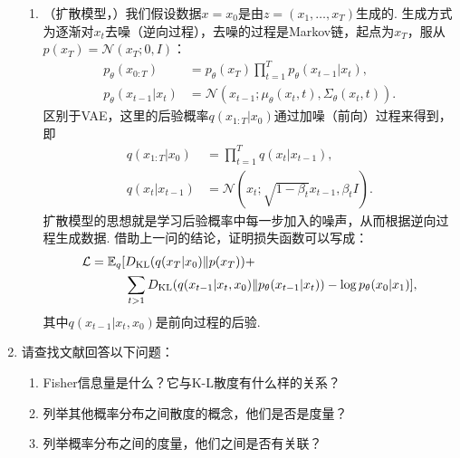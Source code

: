 \begin{enumerate}[wide, labelindent=0pt]
\begin{enumerate}
        \item （扩散模型，\cite{hoDenoisingDiffusionProbabilistic2020}）我们假设数据$x=x_{0}$是由$z=(x_{1},\dots,x_{T})$生成的. 生成方式为逐渐对$x_{t}$去噪（逆向过程），去噪的过程是Markov链，起点为$x_{T}$，服从$p(x_{T}) = \mathcal{N}(x_{T};0,I)$：
        \begin{align*}
            p_{\theta}(x_{0:T}) &= p_{\theta}(x_{T})\prod_{t=1}^{T}p_{\theta}(x_{t-1}|x_{t}),\\
            p_{\theta}(x_{t-1}|x_{t}) &= \mathcal{ N}(x_{t-1}; \mu_{\theta}(x_{t}, t), \Sigma_{\theta}(x_{t}, t)).
        \end{align*}
        区别于VAE，这里的后验概率$q(x_{1:T}|x_{0})$通过加噪（前向）过程来得到，即
        \begin{align*}
            q(x_{1:T}|x_{0}) &= \prod_{t=1}^{T}q(x_{t}|x_{t-1}),\\
            q(x_{t}|x_{t-1}) &= \mathcal{N}(x_{t}; \sqrt{1-\beta_{t}}x_{t-1}, \beta_{t}I).
        \end{align*}
        扩散模型的思想就是学习后验概率中每一步加入的噪声，从而根据逆向过程生成数据.
        借助上一问的结论，证明损失函数可以写成：
        \begin{align*}
            \mathcal{L} = \mathbb{E}_{q} [& D_{\mathrm{KL}}(q(x_{T}|x_{0}) \Vert p(x_{T})) +
            \\& \sum_{t>1} D_{\mathrm{KL}}(q(x_{t-1}|x_{t},x_{0}) \Vert p_{\theta}(x_{t-1}|x_{t})) - \log p_{\theta}(x_{0}|x_{1})
            ],
        \end{align*}
        其中$q(x_{t-1}|x_{t},x_{0})$是前向过程的后验.
    \end{enumerate}

    \item 请查找文献回答以下问题：
    \begin{enumerate}
        \item Fisher信息量是什么？它与K-L散度有什么样的关系？
        \item 列举其他概率分布之间散度的概念，他们是否是度量？
        \item 列举概率分布之间的度量，他们之间是否有关联？
    \end{enumerate}
    
\end{enumerate}